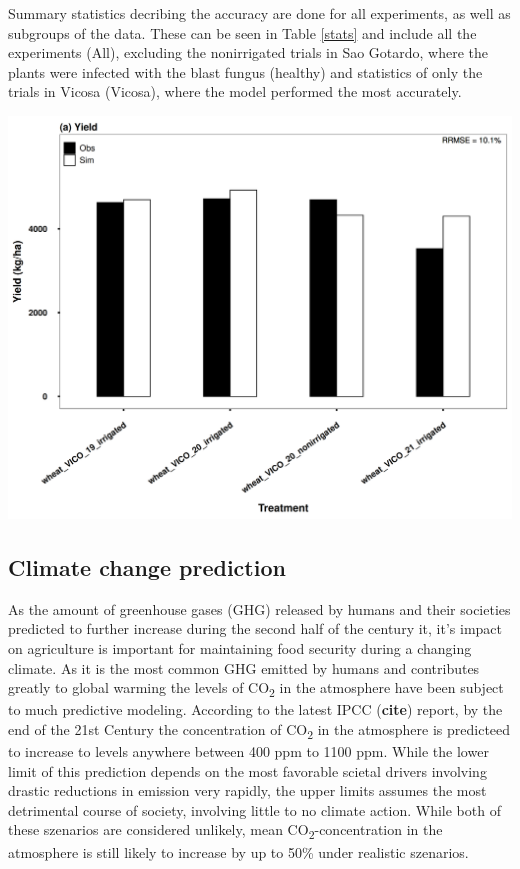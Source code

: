 \documentclass[11pt]{article}
\begin{document}
Summary statistics decribing the accuracy are done for all experiments, as well as subgroups of the data. These can be seen in Table \ref{stats} and include all the experiments (All), excluding the nonirrigated trials in Sao Gotardo, where the plants were infected with the blast fungus (healthy) and statistics of only the trials in Vicosa (Vicosa), where the model performed the most accurately.

\begin{center}
\includegraphics[width=.9\linewidth]{../results/experimental-data/2023-02-18_Vico_only.png}
\end{center}


\subsection{Climate change prediction}
\label{sec:org7cd5d6b}
As the amount of greenhouse gases (GHG) released by humans and their societies predicted to further increase during the second half of the century it, it's impact on agriculture is important for maintaining food security during a changing climate. As it is the most common GHG emitted by humans and contributes greatly to global warming the levels of CO\textsubscript{2} in the atmosphere have been subject to much predictive modeling. According to the latest IPCC (\textbf{cite}) report, by the end of the 21st Century the concentration of CO\textsubscript{2} in the atmosphere is predicteed to increase to levels anywhere between 400 ppm to 1100 ppm. While the lower limit of this prediction depends on the most favorable scietal drivers involving drastic reductions in emission very rapidly, the upper limits assumes the most detrimental course of society, involving little to no climate action. While both of these szenarios are considered unlikely, mean CO\textsubscript{2}-concentration in the atmosphere is still likely to increase by up to 50\% under realistic szenarios.
\end{document}
